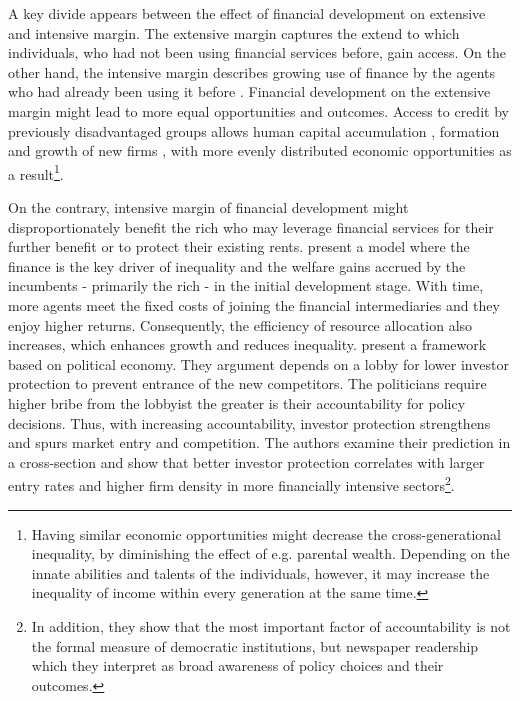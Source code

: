 \documentclass[preprint, nonatbib, 10pt]{elsarticle}
\begin{document}
A key divide appears between the effect of financial development on extensive and intensive margin. The extensive margin captures the extend to which individuals, who had not been using financial services before, gain access. On the other hand, the intensive margin describes growing use of finance by the agents who had already been using it before \parencite{demirgucc2009finance}. Financial development on the extensive margin might lead to more equal opportunities and outcomes. Access to credit by previously disadvantaged groups allows human capital accumulation \parencite{galorzeira1993income, galormoav2004, braunetal2019}, formation and growth of new firms \parencite{evans1989estimated,banerjeenewman1990}, with more evenly distributed economic opportunities as a result\footnote{Having similar economic opportunities might decrease the cross-generational inequality, by diminishing the effect of e.g. parental wealth. Depending on the innate abilities and talents of the individuals, however, it may increase the inequality of income within every generation at the same time.}.

On the contrary, intensive margin of financial development might disproportionately benefit the rich who may leverage financial services for their further benefit or to protect their existing rents. \textcite{GreenwoodJovanovic1990} present a model where the finance is the key driver of inequality and the welfare gains accrued by the incumbents - primarily the rich - in the initial development stage. With time, more agents meet the fixed costs of joining the financial intermediaries and they enjoy higher returns. Consequently, the efficiency of resource allocation also increases, which enhances growth and reduces inequality. \textcite{perotti2007investor} present a framework based on political economy. They argument depends on a lobby for lower investor protection to prevent entrance of the new competitors. The politicians require higher bribe from the lobbyist the greater is their accountability for policy decisions. Thus, with increasing accountability, investor protection strengthens and spurs market entry and competition. The authors examine their prediction in a cross-section and show that better investor protection correlates with larger entry rates and higher firm density in more financially intensive sectors\footnote{In addition, they show that the most important factor of accountability is not the formal measure of democratic institutions, but newspaper readership which they interpret as broad awareness of policy choices and their outcomes.}. 
\end{document}
